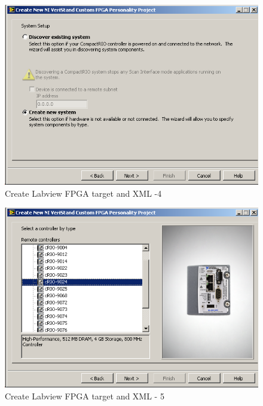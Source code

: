 \documentclass[a4paper,english]{report}
\begin{document}
\begin{figure}[htb!]
	\centering \includegraphics[scale=0.45]{Screenshots/Screenshot_2015-01-16_19-23-58.png}
	\caption{Create Labview FPGA target and XML -4}
	\label{fig: Create Labview FPGA target and XML-4} 
\end{figure}
\begin{figure}[htb!]
	\centering \includegraphics[scale=0.45]{Screenshots/Screenshot_2015-01-16_19-24-31.png}
	\caption{Create Labview FPGA target and XML - 5}
	\label{fig: Create Labview FPGA target and XML-5} 
\end{figure}
\end{document}

